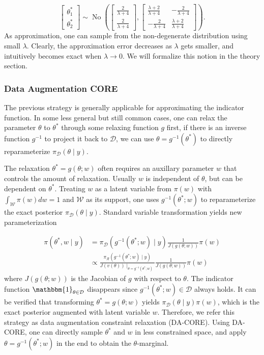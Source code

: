 \documentclass[10pt,fleqn]{article}
\newcommand{\be}{\begin{equation}\begin{aligned}}
\newcommand{\ee}{\end{aligned}\end{equation}}
\newcommand{\mc}[1]{\mathcal{#1}}
\DeclareMathOperator{\No}{No}
\DeclareMathOperator{\1}{\mathbbm{1}}
\begin{document}
$$\begin{bmatrix} \theta^*_1 \\ \theta^*_2 \end{bmatrix} \sim
\No \left(
\begin{bmatrix} \frac{2}{\lambda+4} \\ \frac{2}{\lambda+4} \end{bmatrix},
\begin{bmatrix} \frac{\lambda+2}{\lambda+4} & -\frac{2}{\lambda+4}  \\  -\frac{2}{\lambda+4}  &\frac{\lambda+2}{\lambda+4} \end{bmatrix}
\right).$$
As approximation, one can sample from the non-degenerate distribution using small $\lambda$. Clearly, the approximation error decreases as $\lambda$ gets
smaller, and intuitively becomes exact when $\lambda\rightarrow 0$. We will formalize
this notion in the theory section.

\subsubsection{Data Augmentation CORE}

The previous strategy is generally applicable for approximating the indicator
function. In some less general but
still common cases, one can relax the parameter $\theta$ to $\theta^*$ through some relaxing function
$g$ first, if there is an inverse function $g^{-1}$ to project it back to
$\mc D$, we can use $\theta=g^{-1}(\theta^*)$ to directly reparameterize $\pi_{\mc D}(\theta\mid y)$.


The relaxation $\theta^*=g(\theta;w)$ often requires an auxillary parameter
$w$ that controls the amount of relaxation. Usually $w$ is independent of $\theta$, but can be dependent on $\theta^*$. Treating $w$ as a latent variable from $\pi(w)$  with $\int_{\mc W} \pi(w) dw =1$ and $\mc W$ as
its support, one uses $g^{-1}(\theta^*;w)$ to reparameterize the exact posterior $\pi_{\mc D}(\theta\mid y)$.
Standard variable transformation yields new parameterization


\be
\label{reparameterization}
\pi(\theta^*,w\mid y) & =\pi_{\mc D}(g^{-1}(\theta^*;w)\mid y) \frac{1}{J(g(\theta;w))}  \pi(w) \\
&\propto \frac{\pi_{\mc R}(g^{-1}(\theta^*;w)\mid y) }{ J(v(\theta))\mid_{\theta=g^{-1}(\theta^*;w)} } \frac{1}{J(g(\theta;w))} \pi(w) 
\ee
where   $J(g(\theta;w))$ is the Jacobian of $g$ with respect to $\theta$.
The indicator function $\mathbbm{1}_{\theta\in \mc D}$ disappears since $g^{-1}(\theta^*;w)\in \mc
D$ always holds. It can be verified that transforming $\theta^*=g(\theta;w)$  yields $\pi_{\mc D}(\theta\mid y) \pi(w)$, which is the exact posterior augmented
with latent variable $w$. Therefore, we refer this strategy as data augmentation
constraint relaxation (DA-CORE). Using DA-CORE, one can directly sample $\theta^*$ and $w$ in less constrained
space, and apply $\theta=g^{-1}(\theta^*;w)$ in the end to obtain the $\theta$-marginal.
\end{document}
